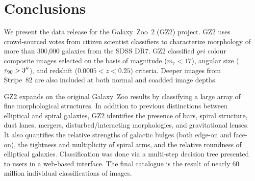 \documentclass[useAMS,usenatbib]{mn2e}
\begin{document}
%


%


\section{Conclusions}\label{sec-conclusion}

We present the data release for the Galaxy~Zoo~2 (GZ2) project. GZ2 uses crowd-sourced votes from citizen scientist classifiers to characterize morphology of more than 300,000 galaxies from the SDSS DR7. GZ2 classified $gri$ colour composite images selected on the basis of magnitude ($m_r<17$), angular size ($r_{90}>3\hbox{$^{\prime\prime}$}$), and redshift ($0.0005<z<0.25$) criteria. Deeper images from Stripe~82 are also included at both normal and coadded image depths. 

GZ2 expands on the original Galaxy~Zoo results by classifying a large array of fine morphological structures. In addition to previous distinctions between elliptical and spiral galaxies, GZ2 identifies the presence of bars, spiral structure, dust lanes, mergers, disturbed/interacting morphologies, and gravitational lenses. It also quantifies the relative strengths of galactic bulges (both edge-on and face-on), the tightness and multiplicity of spiral arms, and the relative roundness of elliptical galaxies. Classification was done via a multi-step decision tree presented to users in a web-based interface. The final catalogue is the result of nearly 60 million individual classifications of images.
\end{document}
